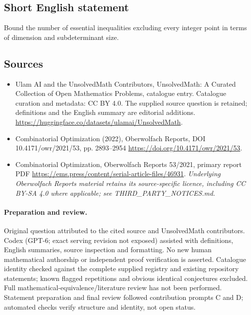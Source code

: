 \documentclass[11pt]{article}
\begin{document}
\subsection{Short English statement}
Bound the number of essential inequalities excluding every integer point in terms of dimension and subdeterminant size.
\subsection{Sources}
\begin{itemize}
\item[\hypertarget{source:statement:1}{S1}] Ulam AI and the UnsolvedMath Contributors, UnsolvedMath: A Curated Collection of Open Mathematics Problems, catalogue entry. Catalogue curation and metadata: CC BY 4.0. The supplied source question is retained; definitions and the English summary are editorial additions.
\url{https://huggingface.co/datasets/ulamai/UnsolvedMath}.
\item[\hypertarget{source:statement:2}{S2}] Combinatorial Optimization (2022), Oberwolfach Reports, DOI 10.4171/owr/2021/53, pp. 2893--2954
\url{https://doi.org/10.4171/owr/2021/53}.
\item[\hypertarget{source:statement:3}{S3}] Combinatorial Optimization, Oberwolfach Reports 53/2021, primary report PDF
\url{https://ems.press/content/serial-article-files/46931}.
\textit{Underlying Oberwolfach Reports material retains its source-specific licence, including CC BY-SA 4.0 where applicable; see THIRD\_PARTY\_NOTICES.md.}
\end{itemize}
\paragraph{Preparation and review.}
Original question attributed to the cited source and UnsolvedMath contributors. Codex (GPT-6; exact serving revision not exposed) assisted with definitions, English summaries, source inspection and formatting. No new human mathematical authorship or independent proof verification is asserted. Catalogue identity checked against the complete supplied registry and existing repository statements; known flagged repetitions and obvious identical conjectures excluded. Full mathematical-equivalence/literature review has not been performed. Statement preparation and final review followed contribution prompts C and D; automated checks verify structure and identity, not open status.
\label{end:statement}
\end{document}
